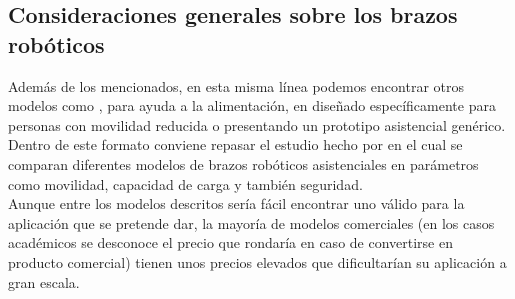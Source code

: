      \vspace{0.1cm}
 \subsection{Consideraciones generales sobre los brazos robóticos}
 
	Además de los mencionados, en esta misma línea podemos encontrar otros modelos como \cite{Arai2011}, para ayuda a la alimentación, en \cite{Chang2003} diseñado específicamente para personas con movilidad reducida o \cite{Ali2007} presentando un prototipo asistencial genérico.
	\\
	
	Dentro de este formato conviene repasar el estudio hecho por \cite{Groothuis2013} en el cual se comparan diferentes modelos de brazos robóticos asistenciales en parámetros como movilidad, capacidad de carga y también seguridad.
	\\
	
    Aunque entre los modelos descritos sería fácil encontrar uno válido para la aplicación que se pretende dar, la mayoría de modelos comerciales (en los casos académicos se desconoce el precio que rondaría en caso de convertirse en producto comercial) tienen unos precios elevados que dificultarían su aplicación a gran escala.
    \\

